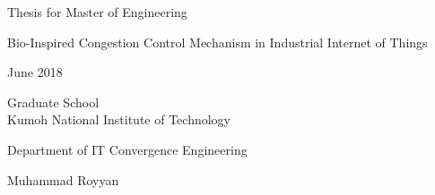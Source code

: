 \begin{titlepage}
	\begin{center}      
		\vspace*{1.5 cm}
		
		
		{\fontsize{14}{20}\selectfont Thesis for Master of Engineering}
		
		\vspace{1.5 cm}
		\begin{spacing}{2.0}
			{\fontsize{22}{30}\selectfont Bio-Inspired Congestion Control Mechanism in Industrial Internet of Things}	
		\end{spacing}
		\vfill
		{\fontsize{14}{20}\selectfont June 2018}
		
		\vspace{1 cm}
		\begin{spacing}{1.5}
			{\fontsize{16}{25}\selectfont Graduate School \\ Kumoh National Institute of Technology}	
		\end{spacing}
		\vspace{1 cm}
		{\fontsize{14}{20}\selectfont Department of IT Convergence Engineering}
		
		\vspace{1 cm}
		{\fontsize{16}{25}\selectfont Muhammad Royyan}
		
		\vspace*{1.5 cm}
	\end{center}
\end{titlepage}